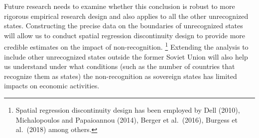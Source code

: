 \documentclass[12pt,a4paper]{article}%
\begin{document}
Future research needs to examine whether this conclusion is robust to more rigorous empirical research design and also applies to all the other unrecognized states. Constructing the precise data on the boundaries of unrecognized states will allow us to conduct spatial regression discontinuity design to provide more credible estimates on the impact of non-recognition.%
\footnote{
	Spatial regression discontinuity design has been employed by Dell (2010), Michalopoulos and Papaioannou (2014), Berger et al.\ (2016), Burgess et al.\ (2018) among others.
}
Extending the analysis to include other unrecognized states outside the former Soviet Union will also help us understand under what conditions (such as the number of countries that recognize them as states) the non-recognition as sovereign states has limited impacts on economic activities.
\end{document}
